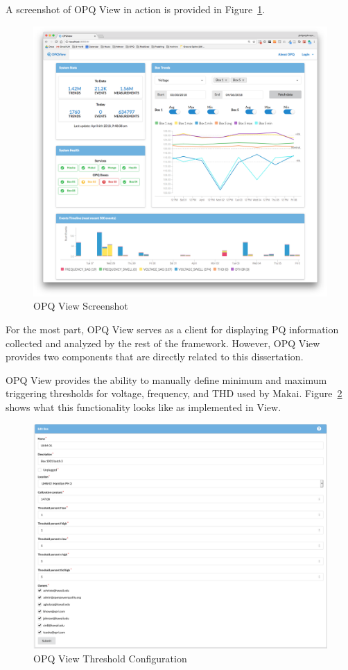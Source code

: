 A screenshot of OPQ View in action is provided in Figure~\ref{fig:opq-view}.

\begin{figure}
	\centering
	\includegraphics[width=1\linewidth]{figures/opqview-landing-page.png}
	\caption{OPQ View Screenshot}\label{fig:opq-view}
\end{figure}

For the most part, OPQ View serves as a client for displaying PQ information collected and analyzed by the rest of the framework. However, OPQ View provides two components that are directly related to this dissertation.

OPQ View provides the ability to manually define minimum and maximum triggering thresholds for voltage, frequency, and THD used by Makai. Figure~\ref{fig:view_thresholds} shows what this functionality looks like as implemented in View.

\begin{figure}
	\centering
	\includegraphics[width=1\linewidth]{figures/view_thresholds.png}
	\caption{OPQ View Threshold Configuration}\label{fig:view_thresholds}
\end{figure}


